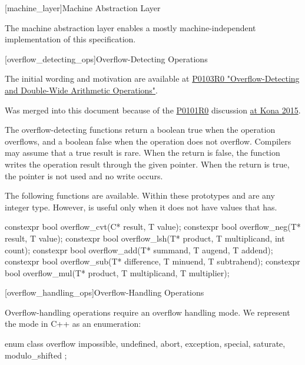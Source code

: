 \begin{addedblock}
[machine_layer]{Machine Abstraction Layer}

The machine abstraction layer enables a mostly machine-independent implementation of this specification.

[overflow_detecting_ops]{Overflow-Detecting Operations}
\begin{reviewnote}
The initial wording and motivation are available at \href{http://www.open-std.org/jtc1/sc22/wg21/docs/papers/2015/p0103r0.html}{P0103R0 "Overflow-Detecting and Double-Wide Arithmetic Operations"}.

Was merged into this document because of the \href{https://wg21.link/P0101R0}{P0101R0} discussion \href{http://wiki.edg.com/bin/view/Wg21kona2015/DiscussionNotes#P0101R0}{at Kona 2015}.
\end{reviewnote}

The overflow-detecting functions return a boolean true when the operation overflows, and a boolean false when the operation does not overflow. Compilers may assume that a true result is rare. When the return is false, the function writes the operation result through the given pointer. When the return is true, the pointer is not used and no write occurs.

The following functions are available. Within these prototypes  and  are any integer type. However,  is useful only when it does not have values that  has.

\begin{codeblock}
constexpr bool overflow_cvt(C* result, T value);
constexpr bool overflow_neg(T* result, T value);
constexpr bool overflow_lsh(T* product, T multiplicand, int count);
constexpr bool overflow_add(T* summand, T augend, T addend);
constexpr bool overflow_sub(T* difference, T minuend, T subtrahend);
constexpr bool overflow_mul(T* product, T multiplicand, T multiplier);
\end{codeblock}

[overflow_handling_ops]{Overflow-Handling Operations}

Overflow-handling operations require an overflow handling mode. We represent the mode in C++ as an enumeration:

\begin{codeblock}
enum class overflow {
  impossible, undefined, abort, exception,
  special,
  saturate, modulo_shifted
};
\end{codeblock}


\end{addedblock}
